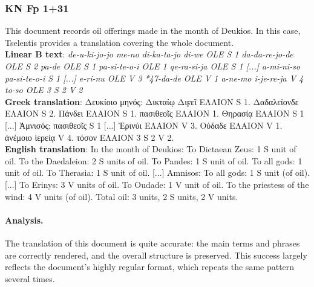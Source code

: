 \subsubsection{KN Fp 1+31}
This document records oil offerings made in the month of Deukios.
In this case, Tselentis provides a translation covering the whole document. \\
\textbf{Linear B text}: \textit{de-u-ki-jo-jo me-no di-ka-ta-jo di-we OLE S 1 da-da-re-jo-de OLE S 2 pa-de OLE S 1 pa-si-te-o-i OLE 1 qe-ra-si-ja OLE S 1 [...] a-mi-ni-so pa-si-te-o-i S 1 [...] e-ri-nu OLE V 3 *47-da-de OLE V 1 a-ne-mo i-je-re-ja V 4 to-so OLE 3 S 2 V 2} \\
\textbf{Greek translation}: \textgreek{Δευκίοιο μηνός: Δικταίῳ Διϝεῖ ΕΛΑΙΟΝ S 1. Δαδαλείονδε ΕΛΑΙΟΝ S 2. Πάνδει ΕΛΑΙΟΝ S 1. πασιθεοῖς ΕΛΑΙΟΝ 1. Θηρασίᾳ ΕΛΑΙΟΝ S 1 [...] Ἀμνισός: πασιθεοῖς S 1 [...] Ἐρινύι ΕΛΑΙΟΝ V 3. Οὐδαδε ΕΛΑΙΟΝ V 1. ἀνέμοιο ἱερείᾳ V 4. τόσον ΕΛΑΙΟΝ 3 S 2 V 2.} \\
\textbf{English translation}: In the month of Deukios: To Dictaean Zeus: 1 S unit of oil. To the Daedaleion: 2 S units of oil. To Pandes: 1 S unit of oil. To all gods: 1 unit of oil. To Therasia: 1 S unit of oil. [...] Amnisos: To all gods: 1 S unit (of oil). [...] To Erinys: 3 V units of oil. To Oudade: 1 V unit of oil. To the priestess of the wind: 4 V units (of oil). Total oil: 3 units, 2 S units, 2 V units.

\paragraph{Analysis.}
The translation of this document is quite accurate: the main terms and phrases are correctly rendered, and the overall structure is preserved.
This success largely reflects the document’s highly regular format, which repeats the same pattern several times.

